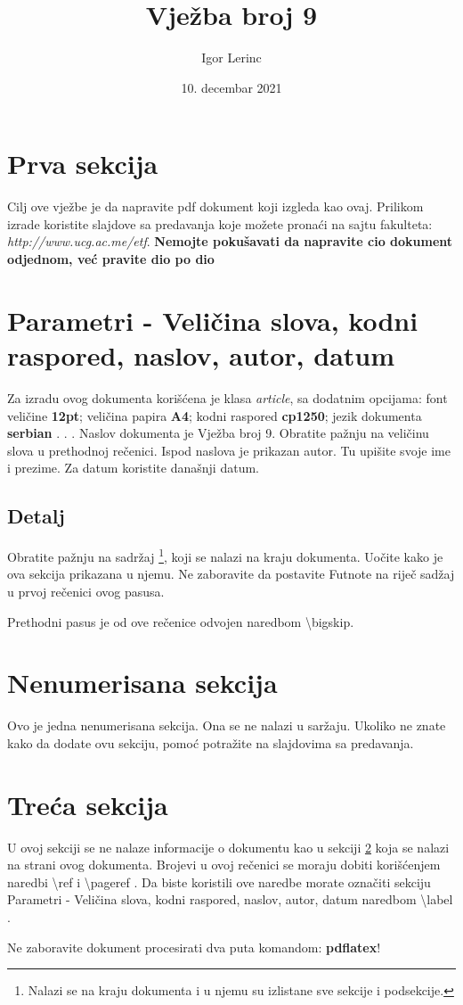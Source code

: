 \documentclass[12pt,a4paper]{article}
\begin{document}
\title{Vježba broj 9}
\author{Igor Lerinc}
\date{10. decembar 2021}
\maketitle
\section{Prva sekcija}
Cilj ove vježbe je da napravite pdf dokument koji izgleda kao ovaj. Prilikom izrade koristite slajdove sa predavanja koje možete pronaći na sajtu fakulteta: {\textit{http://www.ucg.ac.me/etf}.}
{\large{\textbf{Nemojte pokušavati da napravite cio dokument odjednom, već  pravite dio po dio}}}

\section{{\large{Parametri - Veličina slova, kodni raspored, naslov, autor, datum }}}
\label{par}

Za izradu ovog dokumenta korišćena je klasa {\textit{article}}, sa dodatnim opcijama: font veličine {\textbf{12pt}}; veličina papira {\textbf{A4}}; kodni raspored {\textbf{cp1250}}; jezik dokumenta {\textbf{serbian}} . . . Naslov dokumenta je {\Large{Vježba broj 9}}. Obratite pažnju na veličinu slova u prethodnoj rečenici. Ispod naslova je prikazan autor. Tu upišite svoje ime i prezime. Za datum koristite današnji datum.

\subsection{Detalj}
Obratite pažnju na sadržaj \footnote{Nalazi se na kraju dokumenta i u njemu su izlistane sve sekcije i podsekcije.}, koji se nalazi na kraju dokumenta. Uočite kako je ova sekcija prikazana u njemu. Ne zaboravite da postavite Futnote na riječ sadžaj u prvoj rečenici ovog pasusa.
\bigskip

Prethodni pasus je od ove rečenice odvojen naredbom \textbackslash bigskip.

\section*{Nenumerisana sekcija}
Ovo je jedna nenumerisana sekcija. Ona se ne nalazi u saržaju. Ukoliko ne znate kako da dodate ovu sekciju, pomoć potražite na slajdovima sa predavanja.


\section{Treća sekcija}

U ovoj sekciji se ne nalaze informacije o dokumentu kao u sekciji \ref{par} koja se nalazi na strani \pageref{par} ovog dokumenta. Brojevi u ovoj rečenici se moraju dobiti korišćenjem naredbi \textbackslash ref i \textbackslash pageref .
Da biste koristili ove naredbe morate označiti sekciju Parametri - Veličina slova, kodni raspored, naslov, autor, datum naredbom \textbackslash label .


\tiny{Ne zaboravite dokument procesirati dva puta komandom: {\textbf{pdflatex}}!}

\bigskip
\tableofcontents 


 
\end{document}
